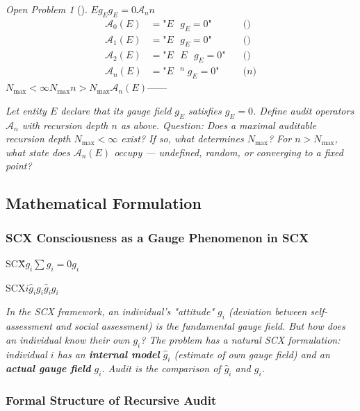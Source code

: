 \documentclass[12pt,a4paper]{article}
\theoremstyle{remark}
\newtheorem{openproblem}[theorem]{Open Problem}
\newcommand{\A}{\mathcal{A}}
\begin{document}
\begin{openproblem}[]
\label{prob:consciousness}
$E$$g_E$$g_E = 0$$\A_n$$n$
\begin{align}
    \A_0(E) &= \text{"}E\text{  }g_E = 0\text{"} \quad &\text{()} \\
    \A_1(E) &= \text{"}E\text{  }g_E = 0\text{"} \quad &\text{()} \\
    \A_2(E) &= \text{"}E\text{  }E\text{  }g_E = 0\text{"} \quad &\text{()} \\
    \A_n(E) &= \text{"}E\text{ }^n\; g_E = 0\text{"} \quad &\text{($n$)}
\end{align}
$N_{\max} < \infty$$N_{\max}$$n > N_{\max}$$\A_n(E)$——
\end{openproblem}

\medskip
\noindent\textit{Let entity $E$ declare that its gauge field $g_E$ satisfies $g_E = 0$. Define audit operators $\A_n$ with recursion depth $n$ as above. Question: Does a maximal auditable recursion depth $N_{\max} < \infty$ exist? If so, what determines $N_{\max}$? For $n > N_{\max}$, what state does $\A_n(E)$ occupy — undefined, random, or converging to a fixed point?}

\subsection{ Mathematical Formulation}

\subsubsection{SCX Consciousness as a Gauge Phenomenon in SCX}

SCX\"\"$g_i$$\sum g_i = 0$\textit{}$g_i$

SCX$i$\textbf{}$\hat{g}_i$\textbf{}$g_i$$\hat{g}_i$$g_i$

\medskip
\noindent\textit{In the SCX framework, an individual's "attitude" $g_i$ (deviation between self-assessment and social assessment) is the fundamental gauge field. But how does an individual \textit{know} their own $g_i$? The problem has a natural SCX formulation: individual $i$ has an \textbf{internal model} $\hat{g}_i$ (estimate of own gauge field) and an \textbf{actual gauge field} $g_i$. Audit is the comparison of $\hat{g}_i$ and $g_i$.}

\subsubsection{ Formal Structure of Recursive Audit}
\end{document}
